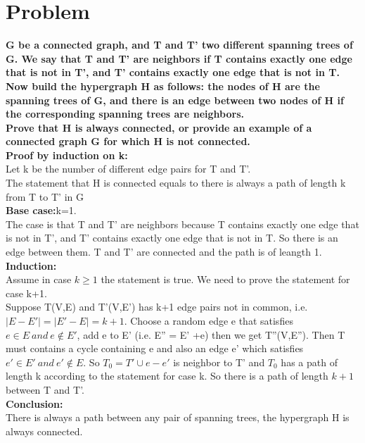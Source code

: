 \documentclass{article}
\begin{document}
\clearpage
\section{Problem \uppercase\expandafter{}} 
\textbf{G be a connected graph, and T and T' two different spanning trees of G.
We say that T and T' are neighbors if T contains exactly one edge that is not in T', and T' contains exactly one edge that is not in T.
Now build the hypergraph H as follows: the nodes of H are the spanning trees of G, and there is an edge between two nodes of H if the corresponding spanning trees are neighbors.\\
Prove that H is always connected, or provide an example of a connected graph G for which H is not connected.}\\
\textbf{\large Proof by induction on k:\\}
Let k be the number of different edge pairs for T and T'.\\
The statement that H is connected equals to there is always a path of length k from T to T' in G\\
\textbf{Base case:}k=1. \\
The case is that T and T' are neighbors because T contains exactly one edge that is not in T', and T' contains exactly one edge that is not in T. So there is an edge between them. T and T' are connected and the path is of leangth 1.
\textbf{Induction:}\\
Assume in case $k \ge 1$ the statement is true. We need to prove the statement for case k+1.\\
Suppose T(V,E) and T'(V,E') has k+1 edge pairs not in common, i.e. $|E-E'|=|E'-E|=k+1$. Choose a random edge e that satisfies $e \in E\ and\ e \notin E'$, add e to E' (i.e. E'' = E' +e) then we get T''(V,E''). Then T must contains a cycle containing e and also an edge e' which satisfies $e' \in E'\ and\ e' \notin E$. So $T_0 = T' \cup e - e'$ is neighbor to T' and $T_0$ has a path of length k according to the statement for case k. So there is a path of length $k+1$ between T and T'.\\
\textbf{Conclusion:\\}
There is always a path between any pair of spanning trees, the hypergraph H is always connected.

\clearpage
\end{document}
